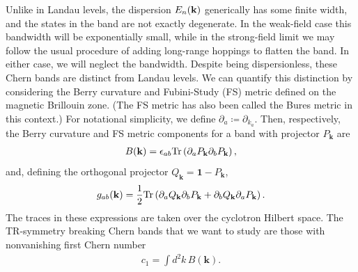 \documentclass[aps,prb,twocolumn,letterpaper,twoside,nobalancelastpage,groupedaddress,amsmath,amssymb,floatfix,citeautoscript]{revtex4-1}
\begin{document}
Unlike in Landau levels, the dispersion $E_{n}({\bf k})$ generically has some finite width, and the states in the band are not exactly degenerate. In the weak-field case this bandwidth will be exponentially small\cite{Harper:2014vi}, while in the strong-field limit we may follow the usual procedure of adding long-range hoppings to flatten the band. \cite{Bergholtz:2013ue,parameswaran_fractional_2013} In either case, we will neglect the bandwidth. Despite being dispersionless, these Chern bands are distinct from Landau levels. We can quantify this distinction by considering the Berry curvature and Fubini-Study (FS) metric defined on the magnetic Brillouin zone\cite{parameswaran_fractional_2013,roy_band_2014,Claassen2015}. (The FS metric has also been called the Bures metric in this context.\cite{palumbo_momentum-space_2017}) For notational simplicity, we define $\partial_a \coloneqq \partial_{k_a}$. Then, respectively, the Berry curvature and FS metric components for a band with projector $P_{\mathbf{k}}$ are
\begin{align*}
B({\bf k}) = \epsilon_{ab}\text{Tr}\left(\partial_{a}P_{\mathbf{k}}\partial_b P_{\mathbf{k}}\right),
\end{align*}
and, defining the orthogonal projector $Q_{\mathbf{k}} = \mathbf{1} - P_{\mathbf{k}}$,
\begin{align*}
g_{ab}({\bf k}) = \frac{1}{2}\text{Tr}\left(\partial_{a}Q_{\mathbf{k}}\partial_{b}P_{\mathbf{k}} + \partial_{b}Q_{\mathbf{k}}\partial_{a} P_{\mathbf{k}}\right). \\
\end{align*}
The traces in these expressions are taken over the cyclotron Hilbert space. The TR-symmetry breaking Chern bands that we want to study are those with nonvanishing first Chern number 
\begin{align*}
c_1 = \int d^2k\, B(\mathbf{k}).
\end{align*}
\end{document}
